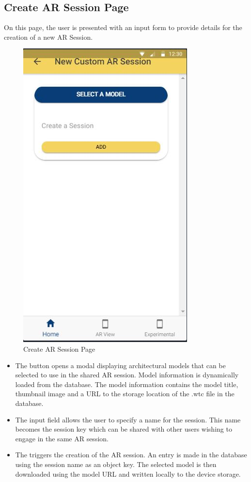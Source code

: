 \subsection{Create AR Session Page}
On this page, the user is presented with an input form to provide details for the creation of a new AR Session.

\begin{figure}[!ht]
\caption{Create AR Session Page}
\centering
\includegraphics[scale=0.55]{images/create_session_page.JPG}
\end{figure}

\begin{itemize}

    \item The  button opens a modal displaying architectural models that can be selected to use in the shared AR session. Model information is dynamically loaded from the database. The model information contains the model title, thumbnail image and a URL to the storage location of the .wtc file in the database. 

    \item The input field allows the user to specify a name for the session. This name becomes the session key which can be shared with other users wishing to engage in the same AR session.
    
    \item The  triggers the creation of the AR session. An entry is made in the database using the session name as an object key. The selected model is then downloaded using the model URL and written locally to the device storage. 

    
\end{itemize}


